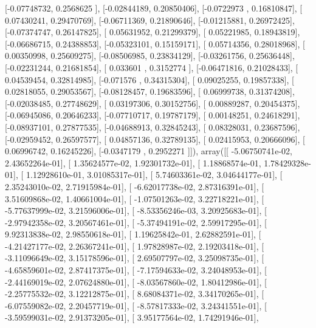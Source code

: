 \documentclass{article}
\begin{document}
       [-0.07748732,  0.2568625 ],
       [-0.02844189,  0.20850406],
       [-0.0722973 ,  0.16810847],
       [ 0.07430241,  0.29470769],
       [-0.06711369,  0.21890646],
       [-0.01215881,  0.26972425],
       [-0.07374747,  0.26147825],
       [ 0.05631952,  0.21299379],
       [ 0.05221985,  0.18943819],
       [-0.06686715,  0.24388853],
       [-0.05323101,  0.15159171],
       [ 0.05714356,  0.28018968],
       [ 0.00350998,  0.25609275],
       [-0.08506985,  0.23834129],
       [-0.03261756,  0.25636448],
       [-0.02231244,  0.21681854],
       [ 0.033601  ,  0.3152774 ],
       [-0.06471816,  0.21028433],
       [ 0.04539454,  0.32814985],
       [-0.071576  ,  0.34315304],
       [ 0.09025255,  0.19857338],
       [ 0.02818055,  0.29053567],
       [-0.08128457,  0.19683596],
       [ 0.06999738,  0.31374208],
       [-0.02038485,  0.27748629],
       [ 0.03197306,  0.30152756],
       [ 0.00889287,  0.20454375],
       [-0.06945086,  0.20646233],
       [-0.07710717,  0.19787179],
       [ 0.00148251,  0.24618291],
       [-0.08937101,  0.27877535],
       [-0.04688913,  0.32845243],
       [ 0.08328031,  0.23687596],
       [-0.02959452,  0.26597577],
       [ 0.04857136,  0.32789135],
       [ 0.02415953,  0.20666096],
       [ 0.06996742,  0.16245226],
       [-0.0347179 ,  0.2952271 ]]), array([[ -5.06750741e-02,   2.43652264e-01],
       [  1.35624577e-02,   1.92301732e-01],
       [  1.18868574e-01,   1.78429328e-01],
       [  1.12928610e-01,   3.01085317e-01],
       [  5.74603361e-02,   3.04644177e-01],
       [  2.35243010e-02,   2.71915984e-01],
       [ -6.62017738e-02,   2.87316391e-01],
       [  3.51609868e-02,   1.40661004e-01],
       [ -1.07501263e-02,   3.22718221e-01],
       [ -5.77637999e-02,   3.21596006e-01],
       [ -8.53356246e-03,   3.20925683e-01],
       [ -2.97942358e-02,   3.20567461e-01],
       [ -5.37494191e-02,   2.59917295e-01],
       [  9.92313838e-02,   2.98550618e-01],
       [  1.19625842e-01,   2.62882591e-01],
       [ -4.21427177e-02,   2.26367241e-01],
       [  1.97828987e-02,   2.19203418e-01],
       [ -3.11096649e-02,   3.15178596e-01],
       [  2.69507797e-02,   3.25098735e-01],
       [ -4.65859601e-02,   2.87417375e-01],
       [ -7.17594633e-02,   3.24048953e-01],
       [ -2.44169019e-02,   2.07624880e-01],
       [ -8.03567860e-02,   1.80412986e-01],
       [ -2.25775532e-02,   3.12212875e-01],
       [  8.68084371e-02,   3.34170265e-01],
       [ -6.07559082e-02,   2.20457719e-01],
       [ -8.57817333e-02,   3.24341551e-01],
       [ -3.59599031e-02,   2.91373205e-01],
       [  3.95177564e-02,   1.74291946e-01],
\end{document}

